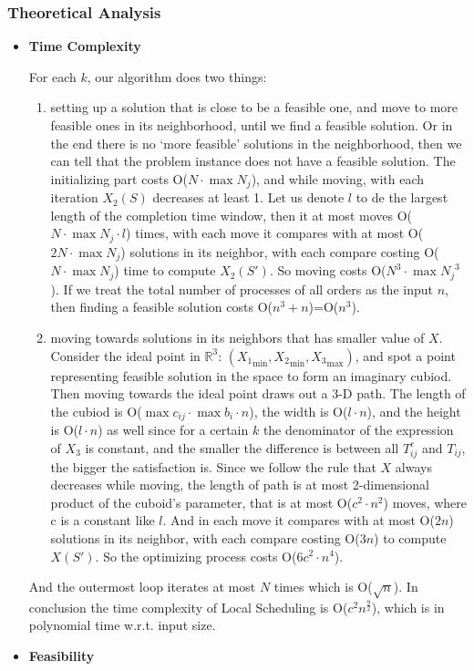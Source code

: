 \documentclass{llncs}
\begin{document}
\subsubsection{Theoretical Analysis}
\begin{itemize}
    \item \textbf{Time Complexity}
    
    For each $k$, our algorithm does two things:\begin{enumerate}
        \item setting up a solution that is close to be a feasible one, and move to more feasible ones in its neighborhood, until we find a feasible solution. Or in the end there is no `more feasible' solutions in the neighborhood, then we can tell that the problem instance does not have a feasible solution. The initializing part costs O($N\cdot\max{N_j}$), and while moving, with each iteration $X_2(S)$ decreases at least 1. Let us denote $l$ to de the largest length of the completion time window, then it at most moves O($N\cdot\max{N_j}\cdot l$) times, with each move it compares with at most O($2N\cdot\max{N_j}$) solutions in its neighbor, with each compare costing O($N\cdot\max{N_j}$) time to compute $X_2(S')$. So moving costs O($N^3\cdot\max{N_j}^3$). If we treat the total number of processes of all orders as the input $n$, then finding a feasible solution costs O($n^3+n$)=O($n^3$).
        \item moving towards solutions in its neighbors that has smaller value of $X$. Consider the ideal point in $\mathbb{R}^3$: $({X_1}_{\min},{X_2}_{\min},{X_3}_{\max})$, and spot a point representing feasible solution in the space to form an imaginary cubiod. Then moving towards the ideal point draws out a 3-D path. The length of the cubiod is O($\max c_{ij}\cdot\max b_i\cdot n$), the width is O($l\cdot n$), and the height is O($l\cdot n$) as well since for a certain $k$ the denominator of the expression of $X_3$ is constant, and the smaller the difference is between all $T_{ij}^e$ and $T_{ij}$, the bigger the satisfaction is. Since we follow the rule that $X$ always decreases while moving, the length of path is at most 2-dimensional product of the cuboid's parameter, that is at most O($c^2\cdot n^2$) moves, where c is a constant like $l$. And in each move it compares with at most O($2n$) solutions in its neighbor, with each compare costing O($3n$) to compute $X(S')$. So the optimizing process costs O($6c^2\cdot n^4$).
    \end{enumerate} 
    And the outermost loop iterates at most $N$ times which is O($\sqrt{n}$). In conclusion the time complexity of Local Scheduling is O($c^2n^\frac{9}{2}$), which is in polynomial time w.r.t. input size.
    \item \textbf{Feasibility}
    

\end{itemize}
\end{document}
